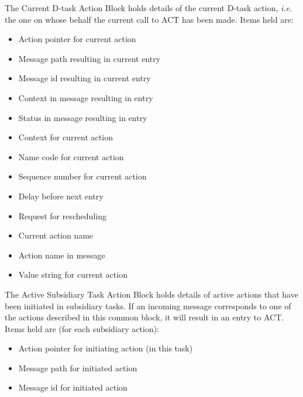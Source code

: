 \documentclass[twoside,11pt]{article}
\renewcommand{\_}{\texttt{\symbol{95}}}
\begin{document}
The Current D-task Action Block holds details of the current D-task action,
\textit{i.e.} the one on whose behalf the current call to ACT has been made.
Items held are:
\begin{itemize}
\item Action pointer for current action
\item Message path resulting in current entry
\item Message id resulting in current entry
\item Context in message resulting in entry
\item Status in message resulting in entry
\item Context for current action
\item Name code for current action
\item Sequence number for current action
\item Delay before next entry
\item Request for rescheduling
\item Current action name
\item Action name in message
\item Value string for current action
\end{itemize}

The Active Subsidiary Task Action Block holds details of active actions that
have been initiated in subsidiary tasks. If an incoming message corresponds to
one of the actions described in this common block, it will result in an entry
to ACT. Items held are (for each subsidiary action):
\begin{itemize}
\item Action pointer for initiating action (in this task)
\item Message path for initiated action
\item Message id for initiated action
\end{itemize}
\vfill
\appendix
\end{document}
